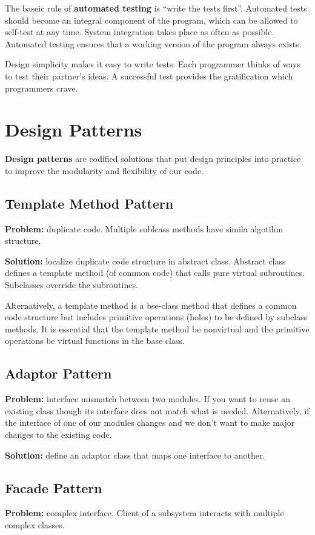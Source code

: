 \documentclass[12pt]{article}
\begin{document}
The baseic rule of {\bf automated testing} is ``write the tests first''. Automated tests should become an integral component of the program, which can be allowed to self-test at any time. System integration takes place as often as possible. Automated testing ensures that a working version of the program always exists.

Design simplicity makes it easy to write tests. Each programmer thinks of ways to test their partner's ideas. A successful test provides the gratification which programmers crave.

\section{Design Patterns}
{\bf Design patterns} are codified solutions that put design principles into practice to improve the modularity and flexibility of our code.

\subsection{Template Method Pattern}
{\bf Problem:} duplicate code. Multiple sublcass methods have simila algotihm structure.

{\bf Solution:} localize duplicate code structure in abstract class. Abstract class defines a template method (of common code) that calls pure virtual subroutines. Subclasses override the subroutines.

Alternatively, a template method is a bse-class method that defines a common code structure but includes primitive operations (holes) to be defined by subclass methods. It is essential that the template method be nonvirtual and the primitive operations be virtual functions in the base class.

\subsection{Adaptor Pattern}
{\bf Problem:} interface mismatch between two modules. If you want to reuse an existing class though its interface does not match what is needed. Alternatively, if the interface of one of our modules changes and we don't want to make major changes to the existing code.

{\bf Solution:} define an adaptor class that maps one interface to another.

\subsection{Facade Pattern}
{\bf Problem:} complex interface. Client of a subsystem interacts with multiple complex classes.
\end{document}
